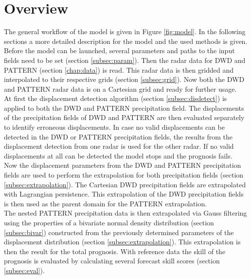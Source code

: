 \documentclass[11pt,twoside,a4paper,fleqn,x11names]{report}
\numberwithin{equation}{chapter}
\numberwithin{figure}{chapter}
\numberwithin{table}{chapter}
\begin{document}
\section{Overview}
The general workflow of the model is given in Figure \ref{fig:model}. In the following sections a more detailed description for the model and the used methods is given. Before the model can be launched, several parameters and paths to the input fields need to be set (section \ref{subsec:param}). Then the radar data for DWD and PATTERN (section \ref{chap:data}) is read. This radar data is then gridded and interpolated to their respective grids (section \ref{subsec:grid}). Now both the DWD and PATTERN radar data is on a Cartesian grid and ready for further usage. \\
At first the displacement detection algorithm (section \ref{subsec:disdetect}) is applied to both the DWD and PATTERN precipitation field. The displacements of the precipitation fields of DWD and PATTERN are then evaluated separately to identify erroneous displacements. In case no valid displacements can be detected in the DWD or PATTERN precipitation fields, the results from the displacement detection from one radar is used for the other radar. If no valid displacements at all can be detected the model stops and the prognosis fails. \\
Now the displacement parameters from the DWD and PATTERN precipitation fields are used to perform the extrapolation for both precipitation fields (section \ref{subsec:extrapolation}). The Cartesian DWD precipitation fields are extrapolated with Lagrangian persistence. This extrapolation of the DWD precipitation fields is then used as the parent domain for the PATTERN extrapolation. \\
The nested PATTERN precipitation data is then extrapolated via Gauss filtering using the properties of a bivariate normal density distribution (section \ref{subsec:bivar}) constructed from the previously determined parameters of the displacement distribution (section \ref{subsec:extrapolation}). This extrapolation is then the result for the total prognosis. With reference data the skill of the prognosis is evaluated by calculating several forecast skill scores (section \ref{subsec:eval}).
\end{document}
